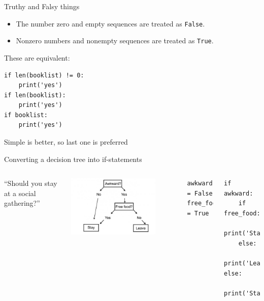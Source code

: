\documentclass[aspectratio=169,usenames,dvipsnames]{beamer}
\begin{document}
\begin{frame}[fragile]{Truthy and Falsy things}
\begin{itemize}
    \item The number zero and empty sequences are treated as \lstinline{False}.
    \item Nonzero numbers and nonempty sequences are treated as \lstinline{True}.
\end{itemize}

These are equivalent:
\begin{lstlisting}
if len(booklist) != 0:
    print('yes')    
if len(booklist):
    print('yes')    
if booklist:
    print('yes')    
\end{lstlisting}

    Simple is better, so last one is preferred
\end{frame}

\begin{frame}[fragile]{Converting a decision tree into if-statements}
    \begin{columns}
            ``Should you stay at a social gathering?''

            \includegraphics[width=0.8\textwidth]{fig/flowchart2}

\begin{lstlisting}
awkward = False
free_food = True
\end{lstlisting}
\pause
\begin{lstlisting}
if awkward:
    if free_food:
        print('Stay')
    else:
        print('Leave')
else:
    print('Stay')
\end{lstlisting}
\end{columns}
\end{frame}
\end{document}
